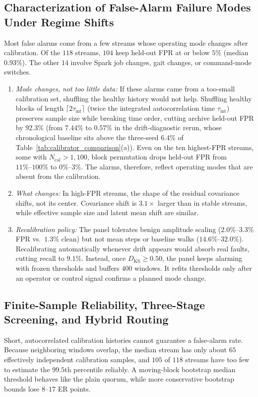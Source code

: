 \subsection{Characterization of False-Alarm Failure Modes Under Regime Shifts}
\label{subsec:regime_shift_modes}
Most false alarms come from a few streams whose operating mode changes after calibration. Of the $118$ streams, $104$ keep held-out FPR at or below $5\%$ (median $0.93\%$). The other $14$ involve Spark job changes, gait changes, or command-mode switches.
\begin{enumerate}[leftmargin=*, nosep, itemsep=1pt]
    \item \emph{Mode changes, not too little data:} If these alarms came from a too-small calibration set, shuffling the healthy history would not help. Shuffling healthy blocks of length $\lceil 2\tau_{\text{int}}\rceil$ (twice the integrated autocorrelation time $\tau_{\text{int}}$) preserves sample size while breaking time order, cutting archive held-out FPR by $92.3\%$ (from $7.44\%$ to $0.57\%$ in the drift-diagnostic rerun, whose chronological baseline sits above the three-seed $6.4\%$ of Table~\ref{tab:calibrator_comparison}(a)). Even on the ten highest-FPR streams, some with $N_{\text{cal}} > 1{,}100$, block permutation drops held-out FPR from $11\%\text{--}100\%$ to $0\%\text{--}3\%$. The alarms, therefore, reflect operating modes that are absent from the calibration.
    \item \emph{What changes:} In high-FPR streams, the shape of the residual covariance shifts, not its center. Covariance shift is $3.1\times$ larger than in stable streams, while effective sample size and latent mean shift are similar.
    \item \emph{Recalibration policy:} The panel tolerates benign amplitude scaling ($2.0\%\text{--}3.3\%$ FPR vs.\ $1.3\%$ clean) but not mean steps or baseline walks ($14.6\%\text{--}32.0\%$). Recalibrating automatically whenever drift appears would absorb real faults, cutting recall to $9.1\%$. Instead, once $D_{\text{KS}}\ge 0.50$, the panel keeps alarming with frozen thresholds and buffers $400$ windows. It refits thresholds only after an operator or control signal confirms a planned mode change.
\end{enumerate}

\subsection{Finite-Sample Reliability, Three-Stage Screening, and Hybrid Routing}
\label{subsec:finite_sample_calibration}
Short, autocorrelated calibration histories cannot guarantee a false-alarm rate. Because neighboring windows overlap, the median stream has only about $65$ effectively independent calibration samples, and $105$ of $118$ streams have too few to estimate the $99.5$th percentile reliably. A moving-block bootstrap median threshold behaves like the plain quorum, while more conservative bootstrap bounds lose $8\text{--}17$ ER points.

